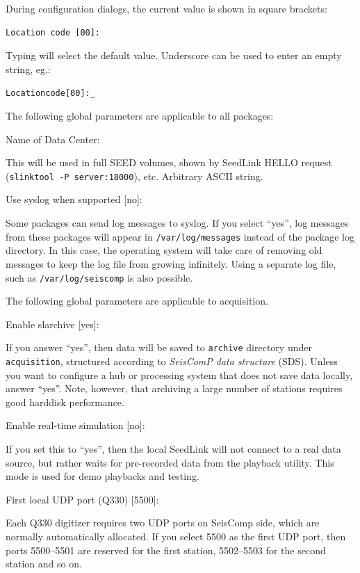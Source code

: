 \documentclass[11pt,a4paper,titlepage]{article}
\newcommand{\pkg}[1]{\textsf{#1}}
\newcommand{\dir}[1]{\texttt{#1}}
\newcommand{\file}[1]{\texttt{#1}}
\newcommand{\cmd}[1]{\texttt{#1}}
\newcommand{\seiscomp}{SeisComp }
\begin{document}
During configuration dialogs, the current value is shown in square
brackets:
\begin{verbatim}
Location code [00]:
\end{verbatim}
Typing  will select the default value. Underscore can be used
to enter an empty string, eg.:
\begin{alltt}
Location code [00]:_
\end{alltt}

The following global parameters are applicable to all packages:
\begin{interface}
\item Name of Data Center:

This will be used in full SEED volumes, shown by SeedLink HELLO request
(\cmd{slinktool -P server:18000}), etc. Arbitrary ASCII string.

\item Use syslog when supported [no]:

Some packages can send log messages to syslog. If you select ``yes'', log
messages from these packages will appear in \file{/var/log/messages}
instead of the package log directory. In this case, the operating system
will take care of removing old messages to keep the log file from growing
infinitely. Using a separate log file, such as \file{/var/log/seiscomp} is
also possible.
\end{interface}

The following global parameters are applicable to \pkg{acquisition}.
\begin{interface}
\item Enable slarchive [yes]:

If you answer ``yes'', then data will be saved to \dir{archive} directory
under \dir{acquisition}, structured according to \emph{SeisComP data
structure} (SDS). Unless you want to configure a hub or processing system
that does not save data locally, answer ``yes''. Note, however, that
archiving a large number of stations requires good harddisk performance.

\item Enable real-time simulation [no]:

If you set this to “yes”, then the local SeedLink will not connect to a
real data source, but rather waits for pre-recorded data from the playback
utility. This mode is used for demo playbacks and testing.

\item First local UDP port (Q330) [5500]:

Each Q330 digitizer requires two UDP ports on \seiscomp side, which are
normally automatically allocated. If you select 5500 as the first UDP port,
then ports 5500--5501 are reserved for the first station, 5502--5503 for
the second station and so on.
\end{interface}
\end{document}
